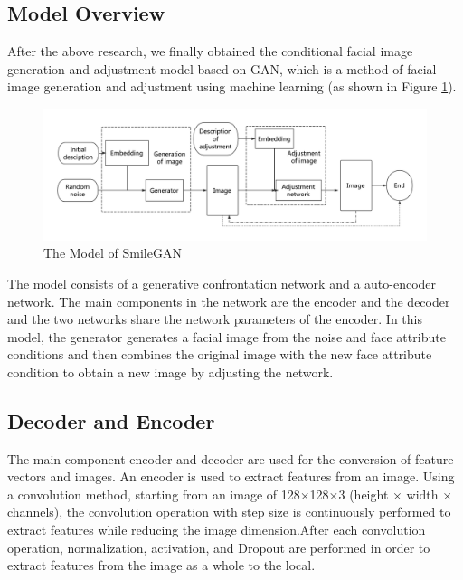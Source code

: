 \subsection{Model Overview}

After the above research, we finally obtained the conditional facial image generation and adjustment model based on GAN,
    which is a method of facial image generation and adjustment using machine learning (as shown in Figure \ref{smliegan}).

\begin{figure}
    \begin{center}
    \includegraphics[width=\textwidth]{figures/model.pdf}
    \caption{The Model of SmileGAN}
    \label{smliegan}
    \end{center}
\end{figure}

The model consists of a generative confrontation network and a auto-encoder network.
The main components in the network are the encoder and the decoder and the two networks share the network parameters of the encoder.
In this model, the generator generates a facial image from the noise and face attribute conditions and then combines the original image with the new face attribute condition to obtain a new image by adjusting the network.


\subsection{Decoder and Encoder}

The main component encoder and decoder are used for the conversion of feature vectors and images.
An encoder is used to extract features from an image.
Using a convolution method, starting from an image of 128×128×3 (height × width × channels),
    the convolution operation with step size is continuously performed to extract features while reducing the image dimension.After each convolution operation,
    normalization, activation, and Dropout are performed in order to extract features from the image as a whole to the local.

